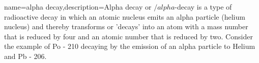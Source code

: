 {name=alpha decay,description={Alpha decay or $/alpha$-decay is a type of radioactive decay in which an atomic nucleus emits an alpha particle (helium nucleus) and thereby transforms or 'decays' into an atom with a mass number that is reduced by four and an atomic number that is reduced by two. Consider the example of Po - 210 decaying by the emission of an alpha particle to Helium and Pb - 206.}}
